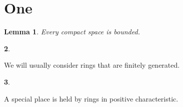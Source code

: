 \documentclass{article}
\newtheorem{lem}{Lemma}[section]
\newtheorem{sta}[lem]{}
\def\st { \begin{sta} \ \end{sta}}
\begin{document}
\section{One}
\begin{lem}
Every compact space is bounded.
\end{lem}

\st  We will usually consider rings that are finitely generated.

\st
A special place is held by rings in positive characteristic.
\end{document}
